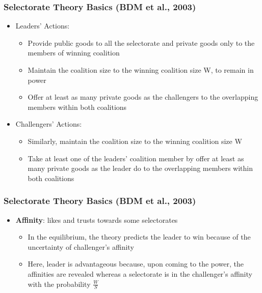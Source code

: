 \documentclass[10pt,handout]{beamer}
\begin{document}
\begin{frame}
\frametitle{Selectorate Theory Basics (BDM et al., 2003)}
\begin{itemize}
    \item[] Leaders' Actions: 
    \begin{itemize}
        \item Provide public goods to all the selectorate and private goods only to the members of winning coalition
        \item Maintain the coalition size to the winning coalition size W, to remain in power
        \item Offer at least as many private goods as the challengers to the overlapping members within both coalitions
    \end{itemize}
    \item[] Challengers' Actions:
    \begin{itemize}
        \item Similarly, maintain the coalition size to the winning coalition size W
        \item Take at least one of the leaders' coalition member by offer at least as many private goods as the leader do to the overlapping members within both coalitions
    \end{itemize} 
\end{itemize}
\end{frame}

\begin{frame}
\frametitle{Selectorate Theory Basics (BDM et al., 2003)}
\begin{itemize}
    \item[] \textbf{Affinity}: likes and trusts towards some selectorates 
    \begin{itemize}
        \item In the equilibrium, the theory predicts the leader to win because of the uncertainty of challenger's affinity
        \item Here, leader is advantageous because, upon coming to the power, the affinities are revealed whereas a selectorate is in the challenger's affinity with the probability $\frac{W}{S}$
    \end{itemize}
\end{itemize}
\end{frame}
\end{document}
